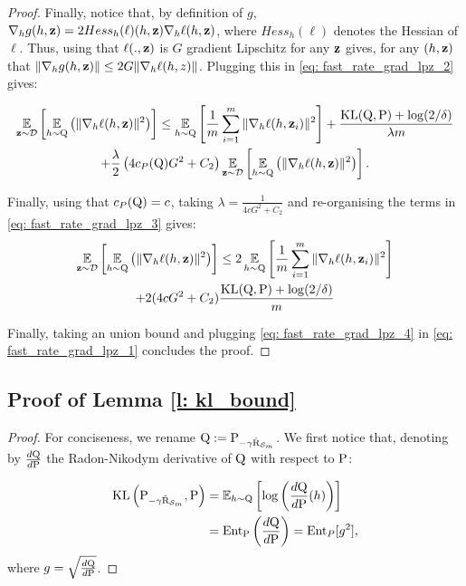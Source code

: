 \begin{noaddcontents}
\begin{proof}
      Finally, notice that, by definition of $g$, $\nabla_h g(h,\z) = 2Hess_h(\ell)(h,\z)\nabla_h \ell (h,\z)$, where $Hess_h(\ell)$ denotes the Hessian of $\ell$. Thus, using that $\ell(., \z)$ is $G$ gradient Lipschitz for any $\z$ gives, for any $(h,\z)$ that $\|\nabla_h g(h,\z)\| \leq 2G \|\nabla_h \ell(h,z)\|$. Plugging this in \eqref{eq: fast_rate_grad_lpz_2} gives: 
    
      \begin{multline}
        \label{eq: fast_rate_grad_lpz_3}
        \EE_{\z\sim\D} \LB \EE_{h\sim \Q}\LP \|\nabla_h \ell(h,\z)\|^2 \RP \RB \leq \EE_{h\sim \Q}\LB \frac{1}{m}\sum_{i=1}^m \|\nabla_h\ell(h,\z_i)\|^2 \RB  + \frac{\KL(\Q,\P) +\log(2/\delta)}{\lambda m} \\
        + \frac{\lambda}{2}\LP 4c_P(\Q)G^2 + C_2 \RP  \EE_{\z\sim\D} \LB \EE_{h\sim \Q}\LP \|\nabla_h \ell(h,\z)\|^2 \RP \RB.
      \end{multline}
    
      Finally, using that $c_P(\Q)=c$, taking $\lambda = \frac{1}{4cG^2 + C_2}$ and re-organising the terms in \eqref{eq: fast_rate_grad_lpz_3} gives:
      \begin{multline}
        \label{eq: fast_rate_grad_lpz_4}
        \EE_{\z\sim\D} \LB \EE_{h\sim \Q}\LP \|\nabla_h \ell(h,\z)\|^2 \RP \RB \leq 2\EE_{h\sim \Q}\LB \frac{1}{m}\sum_{i=1}^m \|\nabla_h\ell(h,\z_i)\|^2 \RB  \\+ 2(4cG^2 + C_2)\frac{\KL(\Q,\P) +\log(2/\delta)}{ m} 
      \end{multline}
    
      Finally, taking an union bound and plugging \eqref{eq: fast_rate_grad_lpz_4} in \eqref{eq: fast_rate_grad_lpz_1} concludes the proof.
    \end{proof}
    
    \subsection{Proof of Lemma \ref{l: kl_bound}}
        \label{sec: proof_kl_bound}
        \begin{proof}
      For conciseness, we rename $\Q:=\P_{-\gamma \hat{\Risk}_{\S_m}}$. We first notice that, denoting by $\frac{d\Q}{d\P}$ the Radon-Nikodym derivative of $\Q$ with respect to $\P$: 
    
      \begin{align*}
        \KL\LP \P_{-\gamma \hat{\Risk}_{\S_m}},\P\RP  & = \mathbb{E}_{h\sim \Q} \LB\log\LP\frac{d\Q}{d\P}(h)\RP \RB  \\
        & = \Ent_{\P} \LP\frac{d\Q}{d\P} \RP = \Ent_P[g^2],
      \end{align*}
      where $g =\sqrt{\frac{d\Q}{d\P}}$.
    

\end{proof}
\end{noaddcontents}
